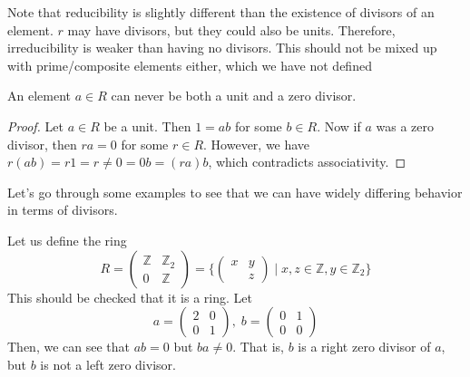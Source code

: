   Note that reducibility is slightly different than the existence of divisors of an element. $r$ may have divisors, but they could also be units. Therefore, irreducibility is weaker than having no divisors. This should not be mixed up with prime/composite elements either, which we have not defined 

  \begin{lemma}
    \label{thm:units-and-zero-divisors-are-mutually-exclusive}
    An element $a \in R$ can never be both a unit and a zero divisor. 
  \end{lemma}
  \begin{proof}
    Let $a \in R$ be a unit. Then $1 = ab$ for some $b \in R$. Now if $a$ was a zero divisor, then $ra = 0$ for some $r \in R$. However, we have $r(ab) = r1 = r \neq 0 = 0b = (ra)b$, which contradicts associativity. 
  \end{proof}

  Let's go through some examples to see that we can have widely differing behavior in terms of divisors. 

  \begin{example}
    \label{ex:left-divisor-but-not-right-divisor-in-matrix}
    Let us define the ring
    \begin{equation}
      R = \begin{pmatrix} \mathbb{Z} & \mathbb{Z}_2 \\ 0 & \mathbb{Z} \end{pmatrix} = \bigg\{ \begin{pmatrix} x & y \\ & z \end{pmatrix} \; \bigg| \; x, z \in \mathbb{Z}, y \in \mathbb{Z}_2 \bigg\} 
    \end{equation}
    This should be checked that it is a ring. Let 
    \begin{equation}
      a = \begin{pmatrix} 2 & 0 \\ 0 & 1 \end{pmatrix}, \; b = \begin{pmatrix} 0 & 1 \\ 0 & 0 \end{pmatrix}
    \end{equation}
    Then, we can see that $ab = 0$ but $ba \neq 0$. That is, $b$ is a right zero divisor of $a$, but $b$ is not a left zero divisor. 
  \end{example}

